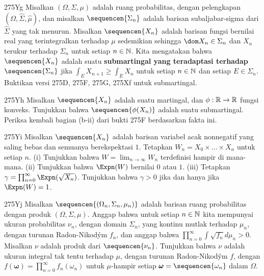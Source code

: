 {\spheader 275Yg Misalkan $(\Omega,\Sigma,\mu)$ adalah ruang probabilitas,
dengan pelengkapan $(\Omega,\hat\Sigma,\hat\mu)$, dan misalkan
$\sequencen{\Sigma_n}$ adalah barisan subaljabar-sigma dari $\hat\Sigma$ yang
tak menurun. Misalkan $\sequencen{X_n}$ adalah barisan fungsi bernilai real
yang terintegralkan terhadap $\mu$ sedemikian sehingga
$\dom X_n\in\Sigma_n$ dan $X_n$ terukur terhadap $\Sigma_n$ untuk setiap
$n\in\Bbb N$. Kita mengatakan bahwa $\sequencen{X_n}$ adalah suatu
{\bf submartingal yang teradaptasi terhadap $\sequencen{\Sigma_n}$} jika
$\int_EX_{n+1}\ge\int_EX_n$ untuk setiap $n\in\Bbb N$ dan setiap
$E\in\Sigma_n$. Buktikan versi 275D, 275F, 275G, 275Xf untuk submartingal.

\spheader 275Yh Misalkan $\sequencen{X_n}$ adalah suatu martingal, dan
$\phi:\Bbb R\to\Bbb R$ fungsi konveks. Tunjukkan bahwa
$\sequencen{\phi(X_n)}$ adalah suatu submartingal. 
Periksa kembali bagian (b-ii) dari bukti 275F berdasarkan fakta ini.

\spheader 275Yi Misalkan $\sequencen{X_n}$ adalah barisan variabel acak
nonnegatif yang saling bebas dan semuanya berekspektasi $1$. Tetapkan
$W_n=X_0\times\ldots\times X_n$ untuk setiap $n$. (i) Tunjukkan bahwa
$W=\lim_{n\to\infty}W_n$ terdefinisi hampir di mana-mana. (ii) Tunjukkan
bahwa $\Expn(W)$ bernilai $0$ atau $1$.  (iii) Tetapkan
$\gamma=\prod_{n=0}^{\infty}\Expn(\sqrt{X_n})$. Tunjukkan bahwa $\gamma>0$
jika dan hanya jika $\Expn(W)=1$.

\spheader 275Yj Misalkan $\sequencen{(\Omega_n,\Sigma_n,\mu_n)}$ adalah
barisan ruang probabilitas dengan produk $(\Omega,\Sigma,\mu)$. Anggap bahwa
untuk setiap $n\in\Bbb N$ kita mempunyai ukuran probabilitas $\nu_n$, dengan
domain $\Sigma_n$, yang kontinu mutlak terhadap $\mu_n$, dengan turunan
Radon-Nikod\'ym $f_n$, dan anggap bahwa
$\prod_{n=0}^{\infty}\int\sqrt{f_n}d\mu_n>0$. Misalkan $\nu$ adalah produk
dari $\sequencen{\nu_n}$. Tunjukkan bahwa $\nu$ adalah ukuran integral tak
tentu terhadap $\mu$, dengan turunan Radon-Nikod\'ym $f$, dengan
$f(\pmb{\omega})=\prod_{n=0}^{\infty}f_n(\omega_n)$ untuk $\mu$-hampir setiap
$\pmb{\omega}=\sequencen{\omega_n}$ dalam $\Omega$.

}
